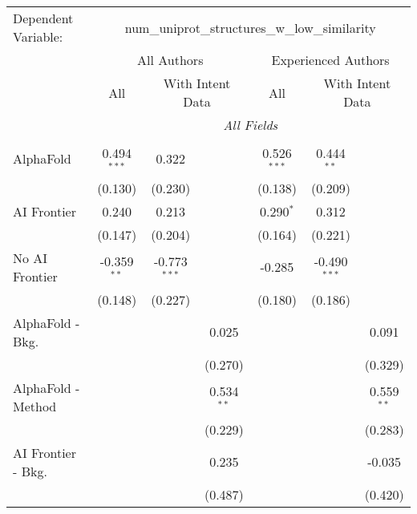 \begingroup
\centering
\begin{tabular}{lcccccc}
   \tabularnewline \midrule \midrule
   Dependent Variable: & \multicolumn{6}{c}{num\_uniprot\_structures\_w\_low\_similarity}\\
 & \multicolumn{3}{c}{All Authors} & \multicolumn{3}{c}{Experienced Authors} \\
\cmidrule(lr){2-4} \cmidrule(lr){5-7}
 & \multicolumn{1}{c}{All} & \multicolumn{2}{c}{With Intent Data} & \multicolumn{1}{c}{All} & \multicolumn{2}{c}{With Intent Data} \\
\cmidrule(lr){2-2} \cmidrule(lr){3-4} \cmidrule(lr){5-5} \cmidrule(lr){6-7}
 & \multicolumn{6}{c}{\textit{All Fields}} \\ \\
   AlphaFold               & 0.494$^{***}$ & 0.322          &               & 0.526$^{***}$ & 0.444$^{**}$   &   \\   
                           & (0.130)       & (0.230)        &               & (0.138)       & (0.209)        &   \\   
   AI Frontier             & 0.240         & 0.213          &               & 0.290$^{*}$   & 0.312          &   \\   
                           & (0.147)       & (0.204)        &               & (0.164)       & (0.221)        &   \\   
   No AI Frontier          & -0.359$^{**}$ & -0.773$^{***}$ &               & -0.285        & -0.490$^{***}$ &   \\   
                           & (0.148)       & (0.227)        &               & (0.180)       & (0.186)        &   \\   
   AlphaFold - Bkg.        &               &                & 0.025         &               &                & 0.091\\   
                           &               &                & (0.270)       &               &                & (0.329)\\   
   AlphaFold - Method      &               &                & 0.534$^{**}$  &               &                & 0.559$^{**}$\\   
                           &               &                & (0.229)       &               &                & (0.283)\\   
   AI Frontier - Bkg.      &               &                & 0.235         &               &                & -0.035\\   
                           &               &                & (0.487)       &               &                & (0.420)\\   

\end{tabular}
